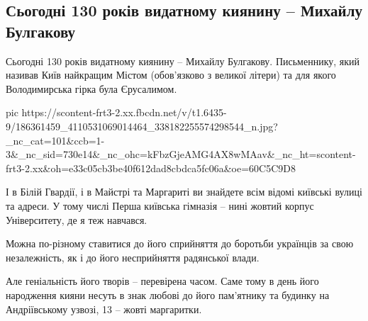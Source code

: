  
 
 
 
 
\subsection{Сьогодні 130 років видатному киянину – Михайлу Булгакову}
\label{sec:15_05_2021.fb.tkachenko_aleksandr.1.bulgakov}

Сьогодні 130 років видатному киянину – Михайлу Булгакову. Письменнику, який
називав Київ найкращим  Містом (обов’язково з великої літери) та для якого
Володимирська гірка була Єрусалимом.

\ifcmt
  pic https://scontent-frt3-2.xx.fbcdn.net/v/t1.6435-9/186361459_4110531069014464_338182255574298544_n.jpg?_nc_cat=101&ccb=1-3&_nc_sid=730e14&_nc_ohc=kFbzGjeAMG4AX8wMAav&_nc_ht=scontent-frt3-2.xx&oh=e33c05cb3be40f612dad8cbdca5fc06a&oe=60C5C9D8
\fi

І в Білій Гвардії, і в Майстрі та Маргариті ви знайдете всім відомі київські
вулиці та адреси. У тому числі Перша київська гімназія – нині жовтий корпус
Університету, де я теж навчався.

Можна по-різному ставитися до його сприйняття до боротьби українців за свою
незалежність, як і до його несприйняття радянської влади. 

Але геніальність його творів – перевірена часом. Саме тому в день його
народження кияни несуть в знак любові до його пам’ятнику та будинку на
Андріївському узвозі, 13 – жовті маргаритки.


